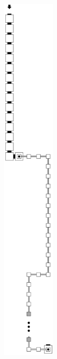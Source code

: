 \begin{figure}[H]
    \centering
    \begin{subfigure}[t]{0.3\textwidth}
        \centering
        \includegraphics[width=0.3\textwidth]{return_paths_read_next_1-or-2_op}

\end{subfigure}
\end{figure}
